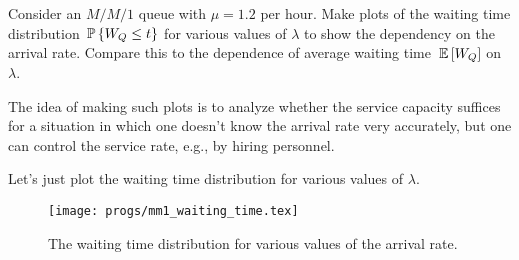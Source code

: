 \begin{question}[use=false]

Consider an $M/M/1$ queue with $\mu=1.2$ per hour. Make plots of the
waiting time distribution $\P{W_Q\leq t}$ for various values of
$\lambda$ to show the dependency on the arrival rate. Compare this to
the dependence of average waiting time $\E{W_Q}$ on $\lambda$.

The idea of making such plots is to analyze
  whether the service capacity suffices for a situation in which one
  doesn't know the arrival rate very accurately, but one can control
  the service rate, e.g., by hiring personnel.
  \begin{solution}
    Let's just plot the waiting time distribution
for various values of $\lambda$. 




\begin{figure}[ht]
  \centering
\texttt{[image: progs/mm1\_waiting\_time.tex]}
  \caption{The waiting time distribution for various values of the arrival rate.}
  \label{fig:waitingtime}
\end{figure}


\end{solution}

\end{question}




